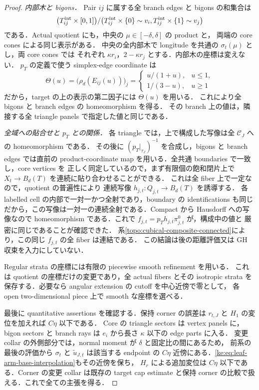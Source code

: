 \begin{proof}
\emph{内部木と bigons．}
Pair $ij$ に属する全 branch edges と bigons の和集合は
\[
 \bigl(T_{ij}^{\rm int}\times[0,1]\bigr)/
 \bigl(T_{ij}^{\rm int}\times\{0\}\sim v_i,
       T_{ij}^{\rm int}\times\{1\}\sim v_j\bigr)
\]
である．Actual quotient にも，中央の $\mu\in[-\delta,\delta]$ の product と，
両端の core cones による同じ表示がある．
中央の全内部木で longitude を共通の $\sigma_t(\mu)$ とし，両 core cones では
それぞれ $\kappa r_i$，$2-\kappa r_j$ とする．内部木の座標は変えない．
$p_T$ の定義で使う simplex-edge coordinate は
\[
 \Theta(u)=\bigl(\rho_d(E_{ij}(u))\bigr)_j
 =\begin{cases}u/(1+u),&u\le1,\\1/(3-u),&u\ge1\end{cases}
\]
だから，target の上の表示の第二因子には $\Theta(u)$ を用いる．
これにより全 bigons と branch edges の homeomorphism を得る．
その branch 上の値は，隣接する全 triangle panels で指定した値と同じである．

\emph{全域への貼合せと $p_T$ との関係．}
各 triangle では，上で構成した写像は全 $\mathcal C_J$ への homeomorphism である．
その後に $(p_T|_{\tau_J})^{-1}$ を合成し，bigons と branch edges では直前の
product-coordinate map を用いる．全共通 boundaries で一致し，core vertices を
正しく同定しているので，まず有限個の飽和閉片上で
$X_t\to B_d(T)$ を連続に貼り合わせることができる．
これは全 fiber 上で一定なので，quotient の普遍性により
連続写像 $h_{j,t}:Q_{j,t}\to B_d(T)$ を誘導する．
各 labelled cell の内部で一対一かつ全射であり，boundary の identifications も同じ
だから，この写像は一対一の連続全射である．Compact から Hausdorff への写像なので
homeomorphism である．これで $f_{j,t}=p_Th_{j,t}\pi^0_{j,t}$ が，構成中の値と
厳密に同じであることが確認できた．
系\ref{topo:cubical-composite-connected}により，この同じ $f_{j,t}$ の全 fiber は連結である．
この結論は後の距離評価又は GH 収束を入力にしていない．

Regular strata の座標には有限の piecewise smooth refinement を用いる．
これは quotient の座標だけの変更であり，全 actual fibers とその isotropic strata
を保存する．必要なら angular extension の cutoff を中心近傍で零として，
各 open two-dimensional piece 上で smooth な座標を選べる．

最後に quantitative assertions を確認する．保持 corner の誤差は
$r_{t,J}$ と $H_1$ の変位を加えれば $C\eta$ 以下である．
Core の triangle sectors は vertex panels に，bigon sectors と branch rays は
$e_i$ から長さ $\kappa$ 以下の edge parts に入る．
変更 collar の外側部分では，normal moment が $\delta$ と固定比の間にあるため，
前系の最後の評価から $\sigma_t$ と $\widetilde u_{J,t}$ は該当する endpoint の
$C\eta$ 近傍にある．\eqref{ke:eq:leaf-arm-base-interpolation}もその近傍を保ち，
$H_r$ による追加変位は $C\eta$ 以下である．Corner の変更 collar は既存の target
cap estimate と保持 corner の比較で扱える．これで全ての主張を得る．
\end{proof}

